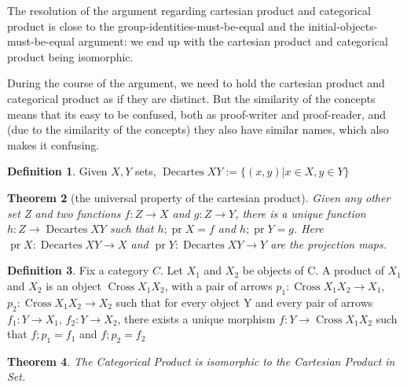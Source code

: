 \documentclass{proc-l}
\newtheorem{theorem}{Theorem}[section]
\theoremstyle{definition}
\newtheorem{definition}[theorem]{Definition}
\theoremstyle{remark}
\numberwithin{equation}{section}
\begin{document}
The resolution of the argument regarding cartesian product and categorical product is close to the group-identities-must-be-equal and the initial-objects-must-be-equal
argument: we end up with the cartesian product and categorical product being isomorphic.

During the course of the argument, we need to hold the cartesian product and categorical product as
if they are distinct. But the similarity of the concepts means that its easy to be confused,
both as proof-writer and proof-reader, and (due to the similarity of the concepts) they also have 
similar names, which also makes it confusing.

\begin{definition}
Given \(X, Y\) sets, 
\(
\operatorname{Decartes} X Y := \{(x,y) | x \in X, y \in Y\}
\)
\end{definition}

\begin{theorem}[the universal property of the cartesian product]
Given any other set Z and two functions \(f: Z \to X\) and \(g: Z \to Y\),
there is a unique function \(h: Z \to \operatorname{Decartes} X Y\)
such that \(h; \operatorname{pr} X = f\) and \(h; \operatorname{pr} Y = g\).
Here \(\operatorname{pr} X: \operatorname{Decartes} X Y \to X\) and \(\operatorname{pr} Y: \operatorname{Decartes} X Y \to Y\) are the projection maps.
\end{theorem}


\begin{definition}

Fix a category \(C\). Let \(X_1\) and \(X_2\) be objects of C. A product of \(X_1\) and \(X_2\) is an object \(\operatorname{Cross} X_1 X_2\),
with a pair of arrows \(p_1: \operatorname{Cross} X_1 X_2 \to X_1\), \(p_2: \operatorname{Cross} X_1 X_2 \to X_2\)
such that
for every object Y and every pair of arrows \(f_1: Y \to X_1\), \(f_2: Y \to X_2\),
there exists a unique morphism \(f: Y \to \operatorname{Cross} X_1 X_2\) such that
\(f; p_1 = f_1\)
and 
\(f; p_2 = f_2\)
\end{definition}

\begin{theorem}
The Categorical Product is isomorphic to the Cartesian Product in Set.
\end{theorem}
\end{document}
